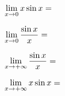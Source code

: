 \documentclass{ximera}
\begin{document}
\begin{example}
\begin{exercise} \def\isC{correct} $\limx x\sin x = $ \localoefoptions \end{exercise}
\begin{exercise} \def\isD{correct} $\limx \frac{\sin x}{x} = $ \localoefoptions \end{exercise}
\begin{exercise} \def\isC{correct} $\limxi \frac{\sin x}{x} = $ \localoefoptions \end{exercise}
\begin{exercise} \def\isE{correct} $\limxi x\sin x = $ \localoefoptions \end{exercise}




\end{example}


\begin{comment}

\begin{exercise} \ 
	Bereken op basis van volgende welbekende grafieken onderstaande limieten

\begin{image}[\textwidth]bestaat niet
	\begin{tikzpicture}
		\begin{axis}
		[
		axis equal,
		ymax=5,ymin=-5,
		samples=200,
		axis lines=center,
		extra y ticks={0},
		  restrict y to domain=-10:10,
		]
		\addplot[domain=-5:5,color=blue] {1/x^2};
		\legend{$1/x^2$}
		\end{axis}
	\end{tikzpicture}
\quad
	\begin{tikzpicture}
	\begin{axis}
	[
	axis equal,
	ymax=5,ymin=-5,
	samples=200,
	axis lines=center,
	extra y ticks={0},
    restrict y to domain=-10:10,
	]
	\addplot[domain=-5:5,color=blue] {1/x};
	\legend{$1/x$}
	\end{axis}
	\end{tikzpicture}
\quad
	\begin{tikzpicture}
	\begin{axis}
	[
    axis equal,
    ymax=5,ymin=-5,
	samples=200,
	axis lines=center,
	extra y ticks={0},
    restrict y to domain=-10:10,
	]
	\addplot[domain=-5:5,color=blue] {exp(x)};
	\addplot[domain=0.001:5,color=blue,dashed] {ln(x)};
	\legend{$e^x$, $\ln x$}
	\end{axis}
	\end{tikzpicture}
\end{image}
	

\end{comment}
\end{document}
